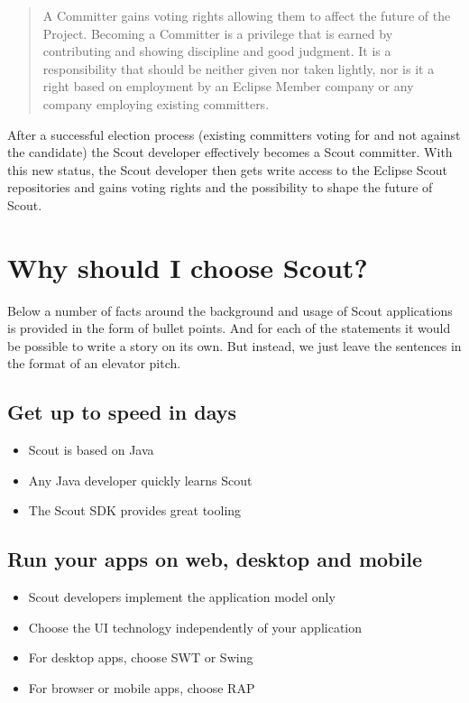 \documentclass[a4paper,10pt,twoside]{book}
\begin{document}
\begin{quotation}
\begin{em}
A Committer gains voting rights allowing them to affect the future of the Project. 
Becoming a Committer is a privilege that is earned by contributing and showing discipline and good judgment. 
It is a responsibility that should be neither given nor taken lightly, nor is it a right based on employment by an Eclipse Member company or any company employing existing committers.
\end{em}
\end{quotation}

\noindent After a successful election process (existing committers voting for and not against the candidate) the Scout developer effectively becomes a Scout committer. 
With this new status, the Scout developer then gets write access to the Eclipse Scout repositories and gains voting rights and the possibility to shape the future of Scout. 
\clearpage

\section{Why should I choose Scout?}

Below a number of facts around the background and usage of Scout applications is provided in the form of bullet points. 
And for each of the statements it would be possible to write a story on its own. 
But instead, we just leave the sentences in the format of an elevator pitch. 

\subsection{Get up to speed in days}
\begin{itemize}
  \item Scout is based on Java
  \item Any Java developer quickly learns Scout
  \item The Scout SDK provides great tooling
\end{itemize}

\subsection{Run your apps on web, desktop and mobile}
\begin{itemize}
  \item Scout developers implement the application model only
  \item Choose the UI technology independently of your application
  \item For desktop apps, choose SWT or Swing
  \item For browser or mobile apps, choose RAP
\end{itemize}
\end{document}

